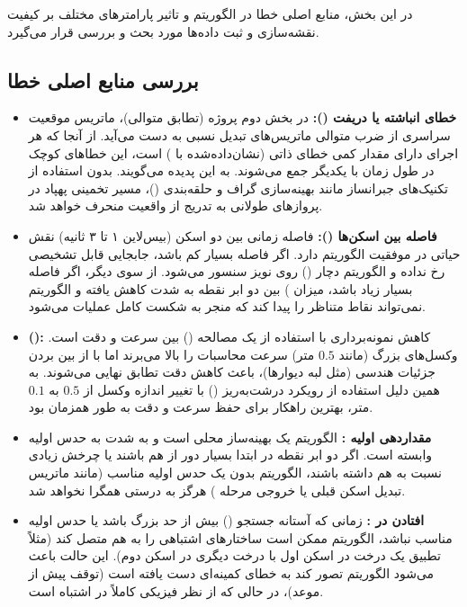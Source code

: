 \documentclass[12pt,a4paper]{article}
\begin{document}
در این بخش، منابع اصلی خطا در الگوریتم  و تاثیر پارامترهای مختلف بر کیفیت نقشه‌سازی و ثبت داده‌ها مورد بحث و بررسی قرار می‌گیرد. 

\subsection{بررسی منابع اصلی خطا}

\begin{itemize}
	\item \textbf{خطای انباشته یا دریفت ():}
	در بخش دوم پروژه (تطابق متوالی)، ماتریس موقعیت سراسری از ضرب متوالی ماتریس‌های تبدیل نسبی به دست می‌آید. از آنجا که هر اجرای  دارای مقدار کمی خطای ذاتی (نشان‌داده‌شده با ) است، این خطاهای کوچک در طول زمان با یکدیگر جمع می‌شوند. به این پدیده  می‌گویند. بدون استفاده از تکنیک‌های جبرانساز مانند بهینه‌سازی گراف و حلقه‌بندی ()، مسیر تخمینی پهپاد در پروازهای طولانی به تدریج از واقعیت منحرف خواهد شد.
	
	\item \textbf{فاصله بین اسکن‌ها ():}
	فاصله زمانی بین دو اسکن (بیس‌لاین ۱ تا ۳ ثانیه) نقش حیاتی در موفقیت الگوریتم دارد. اگر فاصله بسیار کم باشد، جابجایی قابل تشخیصی رخ نداده و الگوریتم دچار () روی نویز سنسور می‌شود. از سوی دیگر، اگر فاصله بسیار زیاد باشد، میزان ) بین دو ابر نقطه به شدت کاهش یافته و الگوریتم نمی‌تواند نقاط متناظر را پیدا کند که منجر به شکست کامل عملیات  می‌شود.
	
	\item \textbf{ ():}
	کاهش نمونه‌برداری با استفاده از  یک مصالحه () بین سرعت و دقت است. وکسل‌های بزرگ (مانند $0.5$ متر) سرعت محاسبات را بالا می‌برند اما با از بین بردن جزئیات هندسی (مثل لبه دیوارها)، باعث کاهش دقت تطابق نهایی می‌شوند. به همین دلیل استفاده از رویکرد درشت‌به‌ریز () با تغییر اندازه وکسل از $0.5$ به $0.1$ متر، بهترین راهکار برای حفظ سرعت و دقت به طور همزمان بود.
	
	\item \textbf{مقداردهی اولیه :}
	الگوریتم  یک بهینه‌ساز محلی است و به شدت به حدس اولیه وابسته است. اگر دو ابر نقطه در ابتدا بسیار دور از هم باشند یا چرخش زیادی نسبت به هم داشته باشند، الگوریتم بدون یک حدس اولیه مناسب (مانند ماتریس تبدیل اسکن قبلی یا خروجی مرحله ) هرگز به درستی همگرا نخواهد شد.
	
	\item \textbf{افتادن در :}
	زمانی که آستانه جستجو () بیش از حد بزرگ باشد یا حدس اولیه مناسب نباشد، الگوریتم ممکن است ساختارهای اشتباهی را به هم متصل کند (مثلاً تطبیق یک درخت در اسکن اول با درخت دیگری در اسکن دوم). این حالت باعث می‌شود الگوریتم تصور کند به خطای کمینه‌ای دست یافته است (توقف پیش از موعد)، در حالی که از نظر فیزیکی کاملاً در اشتباه است.
	

\end{itemize}
\end{document}
